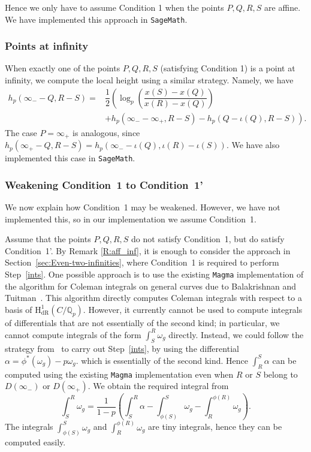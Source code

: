 \documentclass[11pt, a4paper]{amsart}
\newcommand{\Q}{\mathbb{Q}}
\newcommand{\hdr}{\operatorname{H^1_{dR}}}
\newtheorem{cond}{Condition}
\theoremstyle{remark}
\numberwithin{equation}{section}
\newcommand{\sg}{{}}
\begin{document}
 Hence we only have to
assume Condition 1 when the points $P,Q,R,S$ are affine. 
We have implemented this approach in \texttt{SageMath}. 
\subsubsection{Points at infinity}\label{subsec:inf}
When exactly one of the points $P,Q,R,S$ (satisfying Condition 1) is a point at infinity, we compute
  the local height using a similar strategy. Namely, we have
  \begin{align*}
    h_p(\infty_- - Q,R-S)
     =&\dfrac{1}{2}\left(\log_p\left(\dfrac{x(S)-x(Q)}{x(R)-x(Q)}\right)\right.
     \\&+ \left.h_p(\infty_- - \infty_+,R-S)-  h_p(Q-\iota(Q),R-S) \right).
  \end{align*}
The case $P=\infty_+$ is analogous, since $h_p(\infty_+ - Q,R-S)=h_p(\infty_- -\iota(Q),\iota(R)-\iota(S))$. 
We have also implemented this case in \texttt{SageMath}.

\subsubsection{Weakening Condition~1 to Condition~1'}\label{subsec:weakening}
We now explain how Condition~1 may be weakened. However, we have
not implemented this, so in our implementation 
we assume Condition~1.

Assume that the points $P,Q,R,S$ do not satisfy Condition~1, but do
satisfy Condition~1'.
By Remark \ref{R:aff_inf}, it is enough to consider the approach in
Section~\ref{sec:Even-two-infinities}, where Condition~1
is required to perform Step~\eqref{ints}. 
One possible approach is to use the existing {\tt Magma} implementation of the algorithm
for Coleman integrals on general 
curves due to Balakrishnan and
    Tuitman~\cite{BalakrishnanTuitman}. This algorithm directly computes Coleman integrals with
    respect to a basis of $\hdr(C/\Q_p)$. However, it currently cannot be used
    to compute integrals of differentials that are not essentially of the second kind; in particular,
    we cannot compute integrals of the form $\int^R_S\omega_g$ directly.  Instead, we could
    follow the strategy from~\cite{BBHeights} to carry out Step~\eqref{ints}, by using \sg{the differential $\alpha=\phi^{*}(\omega_g)-p\omega_g$. which is essentially of the second kind.}  Hence
    $\int_R^S \alpha$ can be computed using the existing {\tt Magma} implementation even when $R$ or $S$ belong to $D(\infty_-)$
    or $D(\infty_+)$.
    We obtain the required integral from
    \[
    \int_S^R\omega_g=\dfrac{1}{1-p} \left(\int_S^R\alpha - \int_{\phi(S)}^S\omega_g - \int_R^{\phi(R)}\omega_g\right).
    \]
The integrals  \sg{$ \int_{\phi(S)}^S\omega_g$} and \sg{$\int_R^{\phi(R)}\omega_g$} are tiny integrals,
  hence they can be computed easily. 
\end{document}
